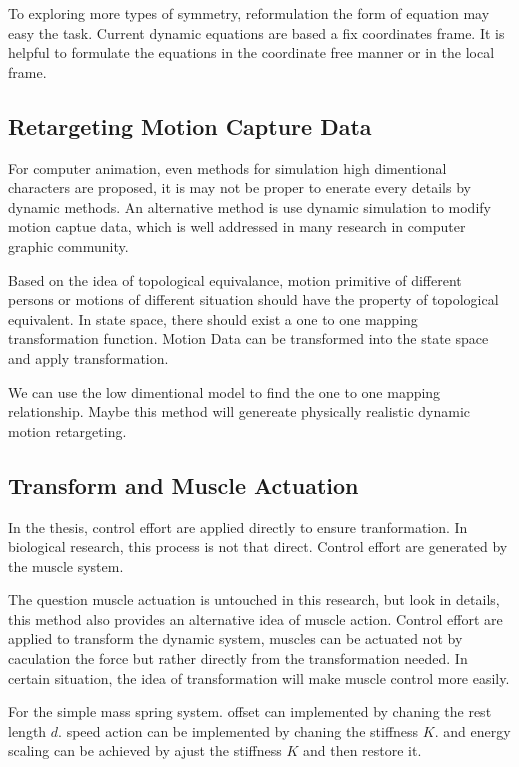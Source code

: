 To exploring more types of symmetry, reformulation the form of equation may easy the task.
Current dynamic equations are based a fix coordinates frame.
It is helpful to formulate the equations in the coordinate free manner or in the local frame.






\subsection{Retargeting Motion Capture Data}
For computer animation, even methods for simulation high dimentional characters are proposed, it is may not be proper to enerate every details by dynamic methods.
An alternative method is use dynamic simulation to modify motion captue data, which is well addressed in many research in computer graphic community.



Based on the idea of topological equivalance, 
motion primitive of different persons or motions of different situation should have the property of topological equivalent.
In state space, there should exist a one to one mapping transformation function.
Motion Data can be transformed into the state space and apply  transformation.


We can use the low dimentional model to find the one to one mapping relationship.
Maybe this method will genereate physically realistic dynamic motion retargeting.





\subsection{Transform and Muscle Actuation}

In the thesis, control effort are applied directly to ensure tranformation.
In biological research, this process is not that direct.
Control effort are generated by the muscle system.


The question muscle actuation is untouched in this research, but look in details, this method also provides an alternative idea of muscle action.
Control effort are applied to transform the dynamic system, muscles can be actuated not by caculation the force but rather directly from the transformation needed.
In certain situation, the idea of transformation will make muscle control more easily.




For the simple  mass spring system.
offset can implemented by chaning the rest length $d$.
speed action can be implemented by chaning the stiffness $K$.
and energy scaling can be achieved by ajust the stiffness $K$ and then restore it.
 

